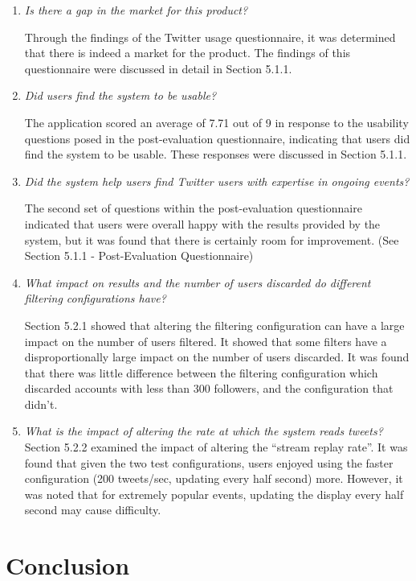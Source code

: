\documentclass{l4proj}
\begin{document}
\begin{enumerate}
\item \textit{Is there a gap in the market for this product?}
\par
Through the findings of the Twitter usage questionnaire, it was determined that there is indeed a market for the product. The findings of this questionnaire were discussed in detail in Section 5.1.1.
\item \textit{Did users find the system to be usable?}
\par
The application scored an average of 7.71 out of 9 in response to the usability questions posed in the post-evaluation questionnaire, indicating that users did find the system to be usable. These responses were discussed in Section 5.1.1.
\item \textit{Did the system help users find Twitter users with expertise in ongoing events?}
\par
The second set of questions within the post-evaluation questionnaire indicated that users were overall happy with the results provided by the system, but it was found that there is certainly room for improvement. (See Section 5.1.1 - Post-Evaluation Questionnaire)
\item \textit{What impact on results and the number of users discarded do different filtering configurations have?}
\par
Section 5.2.1 showed that altering the filtering configuration can have a large impact on the number of users filtered. It showed that some filters have a disproportionally large impact on the number of users discarded. It was found that there was little difference between the filtering configuration which discarded accounts with less than 300 followers, and the configuration that didn't.

\item \textit{What is the impact of altering the rate at which the system reads tweets?}
Section 5.2.2 examined the impact of altering the ``stream replay rate''. It was found that given the two test configurations, users enjoyed using the faster configuration (200 tweets/sec, updating every half second) more. However, it was noted that for extremely popular events, updating the display every half second may cause difficulty.
\end{enumerate}
    

\chapter{Conclusion}
\end{document}
